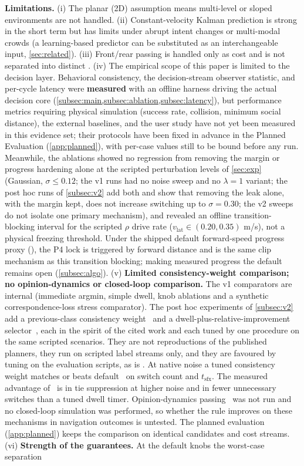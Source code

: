 \noindent\textbf{Limitations.} (i) The planar (2D) assumption means multi-level or sloped environments are not handled. (ii) Constant-velocity Kalman prediction is strong in the short term but has limits under abrupt intent changes or multi-modal crowds (a learning-based predictor can be substituted as an interchangeable input, \cref{sec:related}). (iii) Front/rear passing is handled only as cost and is not separated into distinct . (iv) The empirical scope of this paper is limited to the decision layer. Behavioral consistency, the decision-stream observer statistic, and per-cycle latency were \textbf{measured} with an offline harness driving the actual decision core (\cref{subsec:main,subsec:ablation,subsec:latency}), but performance metrics requiring physical simulation (success rate, collision, minimum social distance), the external baselines, and the user study have not yet been measured in this evidence set; their protocols have been fixed in advance in the Planned Evaluation (\cref{app:planned}), with per-case values still to be bound before any run. Meanwhile, the ablations showed no regression from removing the margin or progress hardening alone at the scripted perturbation levels of \cref{sec:exp} (Gaussian, $\sigma\le0.12$; the v1 runs had no noise sweep and no $\lambda=1$ variant; the post hoc runs of \cref{subsec:v2} add both and show that removing the leak alone, with the margin kept, does not increase  switching up to $\sigma=0.30$; the v2 sweeps do not isolate one primary mechanism), and revealed an offline transition-blocking interval for the scripted $\rho$ drive rate ($v_{\text{lat}} \in (0.20, 0.35)$ m/s), not a physical freezing threshold. Under the shipped default forward-speed progress proxy (), the P4 lock is triggered by forward distance and is the same clip mechanism as this transition blocking; making measured progress the default remains open (\cref{subsec:algo}). (v) \textbf{Limited consistency-weight comparison; no opinion-dynamics or closed-loop comparison.} The v1 comparators are internal (immediate argmin, simple dwell, knob ablations and a synthetic correspondence-loss stress comparator). The post hoc experiments of \cref{subsec:v2} add a previous-class consistency weight~\citep{degroot2024topology,martinezbaselga2026shine} and a dwell-plus-relative-improvement selector~\citep{li2026bigcbf}, each in the spirit of the cited work and each tuned by one procedure on the same scripted scenarios. They are not reproductions of the published planners, they run on scripted label streams only, and they are favoured by tuning on the evaluation scripts, as is \sname. At native noise a tuned consistency weight matches or beats default \sname\ on switch count and $t_{\text{sfx}}$. The measured advantage of \sname\ is in tie suppression at higher noise and in fewer unnecessary switches than a tuned dwell timer. Opinion-dynamics passing~\citep{cathcart2023opinion} was not run and no closed-loop simulation was performed, so whether the rule improves on these mechanisms in navigation outcomes is untested. The planned evaluation (\cref{app:planned}) keeps the comparison on identical candidates and cost streams. (vi) \textbf{Strength of the guarantees.} At the default knobs the worst-case separation 